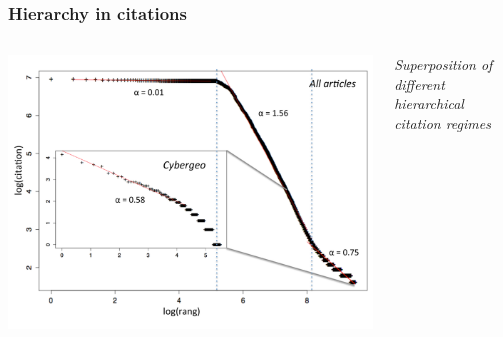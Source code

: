 \begin{frame}
\frametitle{Hierarchy in citations}
\begin{columns}
\begin{column}{0.8\textwidth}
\includegraphics[width=\textwidth]{figures/ranksize.pdf}
\end{column}
\begin{column}{0.2\textwidth}
\justify
\textit{Superposition of different hierarchical citation regimes}
\end{column}
\end{columns}

\end{frame}











